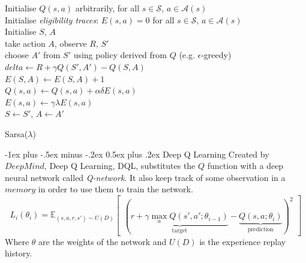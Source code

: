 \documentclass[10pt,landscape]{article}
\makeatletter
\renewcommand{\section}{\@startsection{section}{1}{0mm}%
                                {-1ex plus -.5ex minus -.2ex}%
                                {0.5ex plus .2ex}%
                                {\normalfont\large\bfseries}}
\makeatother
\begin{document}
\begin{multicols}{3}
\begin{algorithm}[H]
    Initialise $Q(s, a)$ arbitrarily, for all $s \in \mathcal{S}$, $a \in \mathcal{A}(s)$\\
     {
        Initialise \emph{eligibility traces}: $E(s, a) = 0$ for all $s \in \mathcal{S}$, $a \in \mathcal{A}(s)$\\
        Initialise $S$, $A$ \\
         {
            take action $A$, observe $R$, $S'$ \\
            choose $A'$ from $S'$ using policy derived from $Q$ (e.g. $\epsilon$-greedy) \\
            $delta \leftarrow R + \gamma Q(S', A') - Q(S, A)$ \\
            $E(S, A) \leftarrow E(S, A) + 1$ \\
             {
                $Q(s, a) \leftarrow Q(s, a) + \alpha \delta E(s, a)$ \\
                $E(s, a) \leftarrow \gamma \lambda E(s, a)$ \\
            }
            $S \leftarrow S'$, $A \leftarrow A'$ \\
        }
    }
    \caption{Sarsa($\lambda$)}
\end{algorithm}

\section{Deep Q Learning}
Created by $DeepMind$, Deep Q Learning, DQL, substitutes the $Q$ function with a deep neural network called \emph{Q-network}. It also keep track of some observation in a $memory$ in order to use them to train the network.
\begin{equation}
L_i(\theta_i) = \mathbb{E}_{(s, a, r, s') \sim U(D)}\begin{bmatrix}
        ( \underbrace{r + \gamma \max\limits_a Q(s',a'; \theta_{i-1})}_\text{target} - \underbrace{Q(s,a;\theta_i)}_\text{prediction})^2
\end{bmatrix}
\end{equation}
Where $\theta$ are the weights of the network and $U(D)$ is the experience replay history.


\end{multicols}
\end{document}
